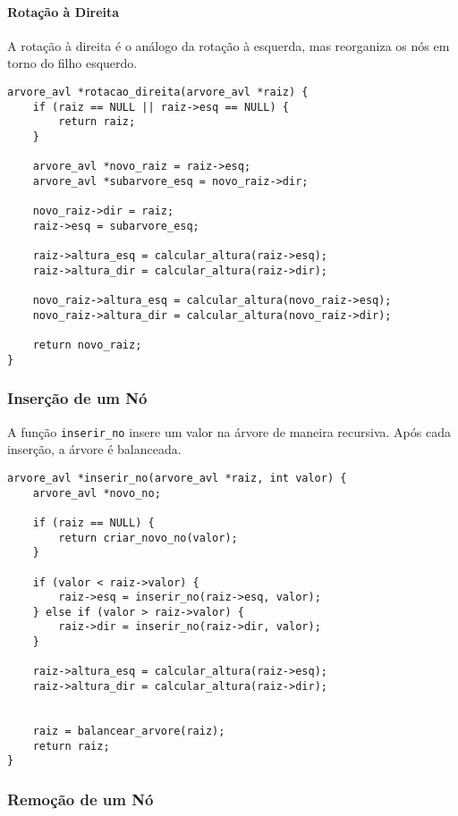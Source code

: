 \paragraph{Rotação à Direita}  
A rotação à direita é o análogo da rotação à esquerda, mas reorganiza os nós em torno do filho esquerdo.

\begin{verbatim}
arvore_avl *rotacao_direita(arvore_avl *raiz) {
    if (raiz == NULL || raiz->esq == NULL) {
        return raiz;
    }
      
    arvore_avl *novo_raiz = raiz->esq;
    arvore_avl *subarvore_esq = novo_raiz->dir;
      
    novo_raiz->dir = raiz;
    raiz->esq = subarvore_esq;
      
    raiz->altura_esq = calcular_altura(raiz->esq);
    raiz->altura_dir = calcular_altura(raiz->dir);
      
    novo_raiz->altura_esq = calcular_altura(novo_raiz->esq);
    novo_raiz->altura_dir = calcular_altura(novo_raiz->dir);
      
    return novo_raiz;
}
\end{verbatim}

\subsubsection{Inserção de um Nó}

A função \texttt{inserir\_no} insere um valor na árvore de maneira recursiva. Após cada inserção, a árvore é balanceada.

\begin{verbatim}
arvore_avl *inserir_no(arvore_avl *raiz, int valor) {
    arvore_avl *novo_no;
      
    if (raiz == NULL) {
        return criar_novo_no(valor);
    }
      
    if (valor < raiz->valor) {
        raiz->esq = inserir_no(raiz->esq, valor); 
    } else if (valor > raiz->valor) {
        raiz->dir = inserir_no(raiz->dir, valor); 
    }
      
    raiz->altura_esq = calcular_altura(raiz->esq);
    raiz->altura_dir = calcular_altura(raiz->dir);
      
      
    raiz = balancear_arvore(raiz);
    return raiz;
}
\end{verbatim}

\subsubsection{Remoção de um Nó}

